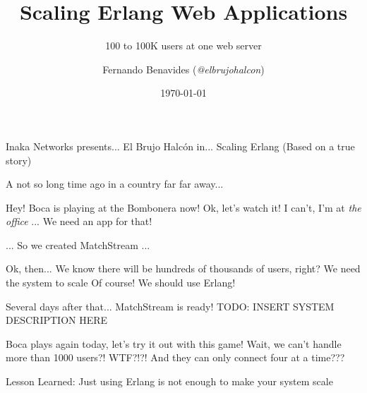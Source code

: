 \documentclass[utf8]{beamer}
\begin{document}
\title{Scaling Erlang Web Applications}
\subtitle{100 to 100K users at one web server}
\author{Fernando Benavides (\textit{@elbrujohalcon})}
\date{\today}


\frame{\titlepage}

\begin{frame}
Inaka Networks presents...
\pause
El Brujo Halc\'on in...
\pause
Scaling Erlang
\pause
(Based on a true story)
\end{frame}

\begin{frame}
A not so long time ago in a country far far away...
\end{frame}

\begin{frame}
Hey! Boca is playing at the Bombonera now!
Ok, let's watch it!
I can't, I'm at \emph{the office}
...
We need an app for that!
\end{frame}

\begin{frame}
... So we created MatchStream ...
\end{frame}

\begin{frame}
Ok, then... We know there will be hundreds of thousands of users, right?
We need the system to \alert{scale}
\pause
Of course! We should use Erlang!
\end{frame}

\begin{frame}
Several days after that...
\pause
MatchStream is ready!
TODO: INSERT SYSTEM DESCRIPTION HERE
\end{frame}

\begin{frame}
Boca plays again today, let's try it out with this game!
\pause
Wait, we can't handle more than 1000 users?! WTF?!?!
\pause
And they can only connect four at a time???
\end{frame}

\begin{frame}
Lesson Learned: Just using Erlang is not enough to make your system scale
\end{frame}
\end{document}
